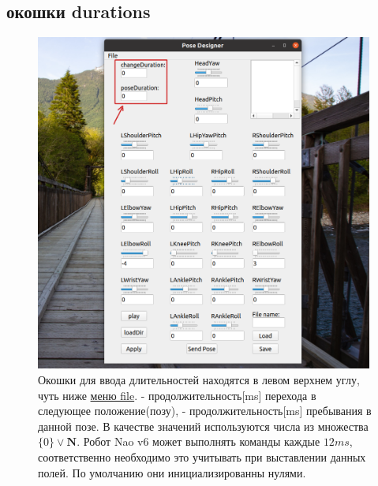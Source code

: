 \documentclass[12pt,a4paper]{article}
\begin{document}
\subsection{окошки durations}
\label{durations}
\begin{figure}[h!]
    \centering
    \includegraphics[width=0.99\textwidth]{images/durations.png}
    \caption{Окошки для ввода длительностей находятся в левом верхнем углу, чуть ниже \hyperref[file]{меню file}.  - продолжительность[ms] перехода в следующее положение(позу),  - продолжительность[ms] пребывания в данной позе. В качестве значений используются числа из множества $\{0\} \vee \mathbf{N}$. Робот Nao v6 может выполнять команды каждые $12ms$, соответственно необходимо это учитывать при выставлении данных полей. По умолчанию они инициализированны нулями. }
    \label{fig:file}
\end{figure}
\newpage
\end{document}
